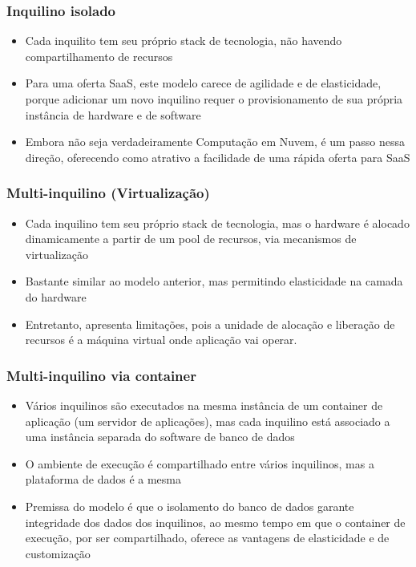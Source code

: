 \begin{frame}
	\frametitle{Inquilino isolado}
	\begin{itemize}
		\item Cada inquilito tem seu próprio stack de tecnologia, não havendo compartilhamento de recursos
		\item Para uma oferta SaaS, este modelo carece de agilidade e de elasticidade, porque adicionar um novo inquilino requer o provisionamento de sua própria instância de hardware e de software
		\item Embora não seja verdadeiramente Computação em Nuvem, é um passo nessa direção, oferecendo como atrativo a facilidade de uma rápida oferta para SaaS
	\end{itemize}
\end{frame}

\begin{frame}
	\frametitle{Multi-inquilino (Virtualização)}
	\begin{itemize}
		\item Cada inquilino tem seu próprio stack de tecnologia, mas o hardware é alocado dinamicamente a partir de um pool de recursos, via mecanismos de virtualização
		\item Bastante similar ao modelo anterior, mas permitindo elasticidade na camada do hardware
		\item Entretanto, apresenta limitações, pois a unidade de alocação e liberação de recursos é a máquina virtual onde aplicação vai operar.
	\end{itemize}
\end{frame}

\begin{frame}
	\frametitle{Multi-inquilino via container}
	\begin{itemize}
		\item Vários inquilinos são executados na mesma instância de um container de aplicação (um servidor de aplicações), mas cada inquilino está associado a uma instância separada do software de banco de dados
		\item O ambiente de execução é compartilhado entre vários inquilinos, mas a plataforma de dados é a mesma
		\item Premissa do modelo é que o isolamento do banco de dados garante integridade dos dados dos inquilinos, ao mesmo tempo em que o container de execução, por ser compartilhado, oferece as vantagens de elasticidade e de customização
	\end{itemize}
\end{frame}

